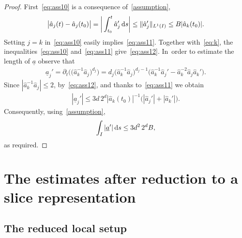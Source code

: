 \documentclass[pdftex]{sigma}
\numberwithin{equation}{section}
\def\p{\partial}
\def\ul{\underline}
\def\we{\hat}
\begin{document}
\begin{proof}
 First~\eqref{eq:ass10} is a consequence of~\eqref{assumption},
 \begin{gather*}
 \big|\we a_j (t) - \we a_j (t_0)\big| = \bigg|\int_{t_0}^t \we a_j' \,{\rm d}s\bigg|
 \le \| \we a_j'\|_{L^1(I)} \le B |\we a_k(t_0)|.
 \end{gather*}
 Setting $j=k$ in~\eqref{eq:ass10} easily implies~\eqref{eq:ass11}. Together with~\eqref{eq:k}, the inequalities~\eqref{eq:ass10} and~\eqref{eq:ass11} give~\eqref{eq:ass12}. In~order to estimate the length of $\ul a$ observe that
 \begin{gather*}
 \ul a_j' = \p_t \big(\big(\we a_k^{-1} \we a_j\big)^{d_j} \big) = d_j \big(\we a_k^{-1} \we a_j\big)^{d_j-1} \big(\we a_k^{-1} \we a_j'
 - \we a_k^{-2} \we a_j \we a_k' \big).
 \end{gather*}
 Since $|\we a_k^{-1} \we a_j| \le 2$, by~\eqref{eq:ass12}, and thanks to~\eqref{eq:ass11} we obtain
 \begin{gather*}
 |\ul a_j'| \le 3 d\, 2^{d} |\we a_k(t_0)|^{-1} \big( |\we a_j'| + |\we a_k'|\big).
 \end{gather*}
 Consequently, using~\eqref{assumption},
 \begin{gather*}
 \int_I |\ul a'| \,{\rm d}s \le 3 d^2\, 2^{d} B,
 \end{gather*}
 as required.
\end{proof}





\section{The estimates after reduction to a slice representation} %



\subsection{The reduced local setup}
\end{document}
